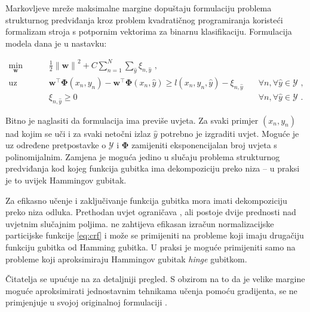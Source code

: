Markovljeve mreže maksimalne margine  dopuštaju formulaciju problema strukturnog predviđanja kroz
problem kvadratičnog programiranja  koristeći
formalizam stroja s potpornim vektorima za binarnu klasifikaciju. Formulacija
\mmmm{} modela dana je u nastavku:

\begin{equation}\label{eq:mmmm}
\begin{aligned}
  \min_{\mathbf{w}} & \quad \frac{1}{2} {\lVert\mathbf{w}\lVert}^2 + C \sum_{n=1}^{N}\sum_{\hat{y}} \xi_{n,\hat{y}} \text{ ,}              & \\
  \text{uz uvjete}  & \quad \mathbf{w}^\top \mathbf{\Phi}(x_n, y_n) - \mathbf{w}^\top \mathbf{\Phi}(x_n, \hat{y}) \ge l(x_n, y_n, \hat{y}) - \xi_{n,\hat{y}} & \quad \forall n, \forall \hat{y} \in \mathcal{Y} \text{ ,}\\
                    & \quad \xi_{n,\hat{y}} \ge 0                                                                                          & \quad \forall n, \forall \hat{y} \in \mathcal{Y} \text{ .}
\end{aligned}
\end{equation}

\noindent
Bitno je naglasiti da \mmmm{} formulacija ima previše uvjeta. Za svaki primjer
$(x_n, y_n)$ nad kojim se uči i za svaki netočni izlaz $\hat{y}$ potrebno je
izgraditi uvjet. Moguće je uz određene pretpostavke o $\mathcal{Y}$ i
$\mathbf{\Phi}$ zamijeniti eksponencijalan broj uvjeta s polinomijalnim. Zamjena
je moguća jedino u slučaju problema strukturnog predviđanja kod kojeg funkcija
gubitka ima dekompoziciju preko niza -- u praksi je to uvijek Hammingov gubitak.

Za efikasno učenje i zaključivanje funkcija gubitka mora imati dekompoziciju
preko niza odluka. Prethodan uvjet ograničava \mmmm{}, ali postoje dvije
prednosti nad uvjetnim slučajnim poljima. \mmmm{} ne zahtijeva efikasan izračun
normalizacijske particijske funkcije \ref{eq:crf} i može se primijeniti na
probleme koji imaju drugačiju funkciju gubitka od Hamming gubitka. U praksi je
moguće primijeniti \mmmm{} samo na probleme koji aproksimiraju Hammingov gubitak
\textit{hinge} gubitkom.

Čitatelja se upućuje na \citep{taskar2003maximum} za detaljniji pregled. S
obzirom na to da je velike margine moguće aproksimirati jednostavnim tehnikama
učenja pomoću gradijenta, \mmmm{} se ne primjenjuje u svojoj originalnoj
formulaciji \citep{daume2005learning, ratliff2006maximum}.
